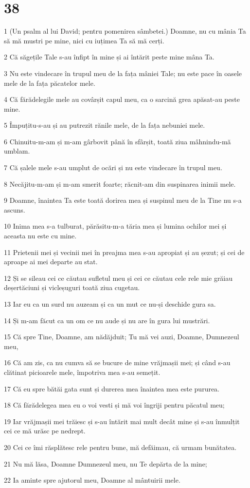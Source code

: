 \chapter{38}

\par 1 (Un psalm al lui David; pentru pomenirea sâmbetei.) Doamne, nu cu mânia Ta să mă mustri pe mine, nici cu iuțimea Ta să mă cerți.
\par 2 Că săgețile Tale s-au înfipt în mine și ai întărit peste mine mâna Ta.
\par 3 Nu este vindecare în trupul meu de la fața mâniei Tale; nu este pace în oasele mele de la fața păcatelor mele.
\par 4 Că fărădelegile mele au covârșit capul meu, ca o sarcină grea apăsat-au peste mine.
\par 5 Împuțitu-s-au și au putrezit rănile mele, de la fața nebuniei mele.
\par 6 Chinuitu-m-am și m-am gârbovit până în sfârșit, toată ziua mâhnindu-mă umblam.
\par 7 Că șalele mele s-au umplut de ocări și nu este vindecare în trupul meu.
\par 8 Necăjitu-m-am și m-am smerit foarte; răcnit-am din suspinarea inimii mele.
\par 9 Doamne, înaintea Ta este toată dorirea mea și suspinul meu de la Tine nu s-a ascuns.
\par 10 Inima mea s-a tulburat, părăsitu-m-a tăria mea și lumina ochilor mei și aceasta nu este cu mine.
\par 11 Prietenii mei și vecinii mei în preajma mea s-au apropiat și au șezut; și cei de aproape ai mei departe au stat.
\par 12 Și se sileau cei ce căutau sufletul meu și cei ce căutau cele rele mie grăiau deșertăciuni și vicleșuguri toată ziua cugetau.
\par 13 Iar eu ca un surd nu auzeam și ca un mut ce nu-și deschide gura sa.
\par 14 Și m-am făcut ca un om ce nu aude și nu are în gura lui mustrări.
\par 15 Că spre Tine, Doamne, am nădăjduit; Tu mă vei auzi, Doamne, Dumnezeul meu,
\par 16 Că am zis, ca nu cumva să se bucure de mine vrăjmașii mei; și când s-au clătinat picioarele mele, împotriva mea s-au semețit.
\par 17 Că eu spre bătăi gata sunt și durerea mea înaintea mea este pururea.
\par 18 Că fărădelegea mea eu o voi vesti și mă voi îngriji pentru păcatul meu;
\par 19 Iar vrăjmașii mei trăiesc și s-au întărit mai mult decât mine și s-au înmulțit cei ce mă urăsc pe nedrept.
\par 20 Cei ce îmi răsplătesc rele pentru bune, mă defăimau, că urmam bunătatea.
\par 21 Nu mă lăsa, Doamne Dumnezeul meu, nu Te depărta de la mine;
\par 22 Ia aminte spre ajutorul meu, Doamne al mântuirii mele.

